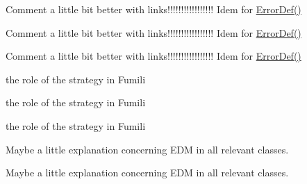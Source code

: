 
\begin{DoxyRefList}
\item[Global \mbox{\hyperlink{classROOT_1_1Minuit2_1_1FCNBase_a04ef08ddad92ce8d89d498efbe021c39}{R\+O\+OT\+:\+:Up}} () const =0]\label{todo__todo000001}%
%
Comment a little bit better with links!!!!!!!!!!!!!!!!! Idem for \mbox{\hyperlink{classROOT_1_1Minuit2_1_1FCNBase_ac4592475c58a65b037ba97ab5f3cba10}{Error\+Def()}}

\label{todo__todo000013}%
%
Comment a little bit better with links!!!!!!!!!!!!!!!!! Idem for \mbox{\hyperlink{classROOT_1_1Minuit2_1_1FCNBase_ac4592475c58a65b037ba97ab5f3cba10}{Error\+Def()}}

\label{todo__todo000025}%
%
Comment a little bit better with links!!!!!!!!!!!!!!!!! Idem for \mbox{\hyperlink{classROOT_1_1Minuit2_1_1FCNBase_ac4592475c58a65b037ba97ab5f3cba10}{Error\+Def()}} 
\item[Class \mbox{\hyperlink{classROOT_1_1Minuit2_1_1FumiliBuilder}{R\+O\+OT\+:\+:Fumili\+Builder}} ]\label{todo__todo000002}%
%
the role of the strategy in Fumili

\label{todo__todo000014}%
%
the role of the strategy in Fumili

\label{todo__todo000026}%
%
the role of the strategy in Fumili 
\item[Global \mbox{\hyperlink{classROOT_1_1Minuit2_1_1FumiliBuilder_a1e7bd763cd6677dd08d528079143d7b2}{R\+O\+OT\+:\+:Estimator}} () const]\label{todo__todo000005}%
%
Maybe a little explanation concerning E\+DM in all relevant classes.

\label{todo__todo000017}%
%
Maybe a little explanation concerning E\+DM in all relevant classes.


\end{DoxyRefList}

